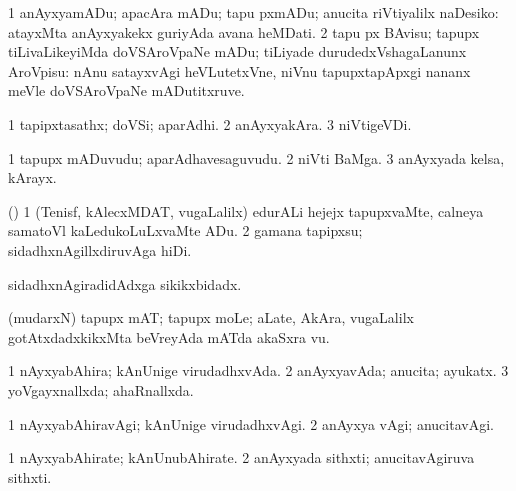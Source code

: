 {{{{{{\begin{center}
{{\bentry
{} 
\gl{\sakirx}
\expl{}
\bmng
\bnum
\num{1} anAyxyamADu; apacAra mADu; tapu pxmADu; anucita riVtiyalilx naDesiko:  atayxMta anAyxyakekx guriyAda avana heMDati. 
\num{2} tapu px BAvisu; tapupx tiLivaLikeyiMda doVSAroVpaNe mADu; tiLiyade durudedxVshagaLanunx AroVpisu:  nAnu satayxvAgi heVLutetxVne, niVnu tapupxtapApxgi nananx meVle doVSAroVpaNe mADutitxruve. 
\enum
\emng
\eentry

\bentry
{} 
\gl{\nA}
\expl{}
\bmng
\bnum
\num{1} tapipxtasathx; doVSi; aparAdhi. 
\num{2} anAyxyakAra. 
\num{3} niVtigeVDi. 
\enum
\emng
\eentry

\bentry
{} 
\gl{\nA}
\expl{}
\bmng
\bnum
\num{1} tapupx mADuvudu; aparAdhavesaguvudu. 
\num{2} niVti BaMga. 
\num{3} anAyxyada kelsa, kArayx. 
\enum
\emng
\eentry

\bentry
{} 
\gl{\sakirx}
\expl{}
\bmng
(\AmA) 
\bnum
\num{1} (Tenisf, kAlecxMDAT, \mo vugaLalilx) edurALi hejejx tapupxvaMte, calneya samatoVl kaLedukoLuLxvaMte ADu. 
\num{2} gamana tapipxsu; sidadhxnAgillxdiruvAga hiDi. 
\enum
\emng
\eentry

\bentry
{} 
\gl{\gu}
\expl{}
\bmng
sidadhxnAgiradidAdxga sikikxbidadx. 
\emng
\eentry

\bentry
{} 
\gl{\nA}
\expl{}
\bmng
{} 
\emng
\eentry

\bentry
{} 
\gl{\nA}
\expl{}
\bmng
(mudarxN) tapupx mAT; tapupx moLe; aLate, AkAra, \mo vugaLalilx gotAtxdadxkikxMta beVreyAda mATda akaSxra \mo vu. 
\emng
\eentry

\bentry
{} 
\gl{\gu}
\expl{}
\bmng
\bnum
\num{1} nAyxyabAhira; kAnUnige virudadhxvAda. 
\num{2} anAyxyavAda; anucita; ayukatx. 
\num{3} yoVgayxnallxda; ahaRnallxda. 
\enum
\emng
\eentry

\bentry
{} 
\gl{\kirxvi}
\expl{}
\bmng
\bnum
\num{1} nAyxyabAhiravAgi; kAnUnige virudadhxvAgi. 
\num{2} anAyxya vAgi; anucitavAgi. 
\enum
\emng
\eentry

\bentry
{} 
\gl{\nA}
\expl{}
\bmng
\bnum
\num{1} nAyxyabAhirate; kAnUnubAhirate. 
\num{2} anAyxyada sithxti; anucitavAgiruva sithxti. 
\enum
\emng
\eentry

}}
\end{center}}}}}}}
